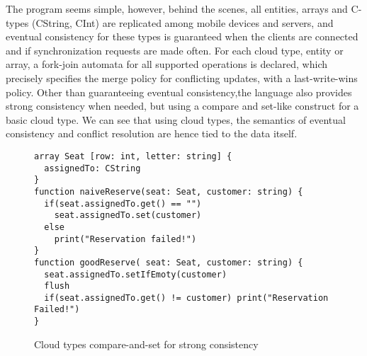 The program seems simple, however, behind the scenes, all entities, arrays and C-types
(CString, CInt) are replicated among mobile devices and servers, and eventual consistency for these types is
guaranteed when the clients are connected and if synchronization requests are made
often. For each cloud type, entity or array, a fork-join automata for all
supported operations is declared, which precisely specifies the merge policy for
conflicting updates, with a last-write-wins policy. 
Other than guaranteeing eventual consistency,the language also provides strong consistency
when needed, but using a compare and set-like construct for a basic cloud type.
We can see that using cloud types, the semantics of eventual consistency and conflict
resolution are hence tied to the data itself. \\
\begin{figure}[tp]
\begin{lstlisting}
array Seat [row: int, letter: string] {
  assignedTo: CString
}
function naiveReserve(seat: Seat, customer: string) {
  if(seat.assignedTo.get() == "")
    seat.assignedTo.set(customer)
  else 
    print("Reservation failed!")
}
function goodReserve( seat: Seat, customer: string) {
  seat.assignedTo.setIfEmoty(customer)
  flush
  if(seat.assignedTo.get() != customer) print("Reservation Failed!")
}
\end{lstlisting}
\caption{Cloud types compare-and-set for strong consistency}
\label{lst:acCmpSet}
\end{figure}


